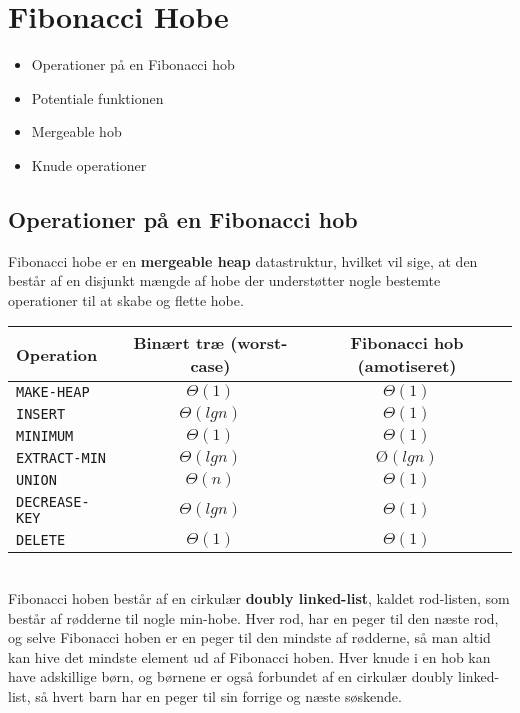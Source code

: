 \section{Fibonacci Hobe}
\hrulefill
\begin{itemize}
  \item Operationer på en Fibonacci hob
  \item Potentiale funktionen
  \item Mergeable hob
  \item Knude operationer
\end{itemize}

\newpage
\subsection{Operationer på en Fibonacci hob}
Fibonacci hobe er en \textbf{mergeable heap} datastruktur, hvilket vil sige, at den består af en disjunkt mængde af hobe der understøtter nogle bestemte operationer til at skabe og flette hobe.\\

\begin{tabular}{lcc}
Operation & Binært træ (worst-case) & Fibonacci hob (amotiseret)\\
\hline
     \texttt{MAKE-HEAP} & $\Theta(1)$ & $\Theta(1)$ \\
     \texttt{INSERT} & $\Theta(lgn)$ & $\Theta(1)$ \\
     \texttt{MINIMUM} & $\Theta(1)$ & $\Theta(1)$ \\
     \texttt{EXTRACT-MIN} & $\Theta(lgn)$ & $Ø(lgn)$ \\
     \texttt{UNION} & $\Theta(n)$ & $\Theta(1)$ \\
     \texttt{DECREASE-KEY} & $\Theta(lgn)$ & $\Theta(1)$ \\
     \texttt{DELETE} & $\Theta(1)$ & $\Theta(1)$ \\
\end{tabular}

\quad\\

Fibonacci hoben består af en cirkulær \textbf{doubly linked-list}, kaldet rod-listen, som består af rødderne til nogle min-hobe. Hver rod, har en peger til den næste rod, og selve Fibonacci hoben er en peger til den mindste af rødderne, så man altid kan hive det mindste element ud af Fibonacci hoben. Hver knude i en hob kan have adskillige børn, og børnene er også forbundet af en cirkulær doubly linked-list, så hvert barn har en peger til sin forrige og næste søskende.\\

